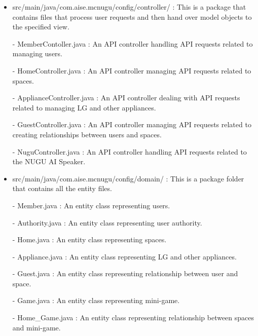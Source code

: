 \documentclass[conference]{IEEEtran}
\begin{document}
\begin{itemize}
                \item src/main/java/com.aise.mcnugu/config/controller/ : This is a package that contains files that process user requests and then hand over model objects to the specified view.
                    \item[-] MemberContoller.java : An API controller handling API requests related to managing users.
                    \item[-] HomeController.java : An API controller managing API requests related to spaces.
                    \item[-] ApplianceController.java : An API controller dealing with API requests related to managing LG and other appliances.
                    \item[-] GuestController.java : An API controller managing API requests related to creating relationships between users and spaces.
                    \item[-] NuguController.java : An API controller handling API requests related to the NUGU AI Speaker.
                \vspace{3mm}
                
                \item src/main/java/com.aise.mcnugu/config/domain/ : This is a package folder that contains all the entity files.
                    \item[-] Member.java : An entity class representing users.
                    \item[-] Authority.java : An entity class representing user authority.
                    \item[-] Home.java : An entity class representing spaces.
                    \item[-] Appliance.java : An entity class representing LG and other appliances.
                    \item[-] Guest.java : An entity class representing relationship between user and space.
                    \item[-] Game.java : An entity class representing mini-game.
                    \item[-] Home\_Game.java : An entity class representing relationship between spaces and mini-game.
                \vspace{3mm}
                

\end{itemize}
\end{document}
